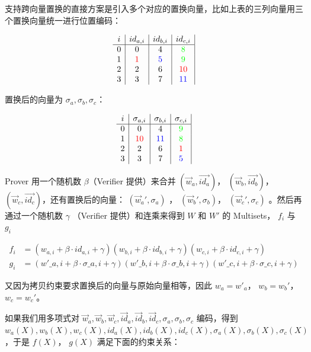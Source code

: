 支持跨向量置换的直接方案是引入多个对应的置换向量，比如上表的三列向量用三个置换向量统一进行位置编码：

\[
\begin{array}{c|c|c|c|}
i & id_{a,i} & id_{b,i} & id_{c,i}  \\
\hline
0 & 0 & 4 & {\color{green}8} \\
1 & {\color{red}1} & {\color{blue}5} & {\color{green}9} \\
2 & 2 & 6 & {\color{red}10} \\
3 & 3 & 7 & {\color{blue}11} \\
\end{array}
\]

置换后的向量为 \(\sigma_a, \sigma_b, \sigma_c\)：

\[
\begin{array}{c|c|c|c|}
i & \sigma_{a,i} & \sigma_{b,i} & \sigma_{c,i}  \\
\hline
0 & 0 & 4 & {\color{green}9} \\
1 & {\color{red}10} & {\color{blue}11} & {\color{green}8} \\
2 & 2 & 6 & {\color{red}1} \\
3 & 3 & 7 & {\color{blue}5} \\
\end{array}
\]

Prover 用一个随机数 \(\beta\)（Verifier 提供）来合并
\((\vec{w}_a, \vec{id_a})\)， \((\vec{w}_b, \vec{id_b})\)，
\((\vec{w}_c, \vec{id_c})\)，还有置换后的向量：
\((\vec{w}_a', \sigma_a)\) ， \((\vec{w}_b', \sigma_b)\)，
\((\vec{w}_c', \sigma_c)\) 。然后再通过一个随机数 \(\gamma\) （Verifier
提供）和连乘来得到 \(W\) 和 \(W'\) 的 Multisets， \({f_i}\) 与
\({g_i}\)

\[
\begin{split}
f_i &= (w_{a,i}+\beta\cdot id_{a,i}+\gamma)(w_{b,i}+\beta\cdot id_{b,i}+\gamma)(w_{c,i}+\beta\cdot id_{c,i}+\gamma) \\
g_i &= (w'\_{a,i}+\beta\cdot \sigma\_{a,i}+\gamma)(w'\_{b,i}+\beta\cdot \sigma\_{b,i}+\gamma)(w'\_{c,i}+\beta\cdot \sigma\_{c,i}+\gamma)
\end{split}
\]

又因为拷贝约束要求置换后的向量与原始向量相等，因此 \(w_a=w'_a\)，
\(w_b=w_b'\)， \(w_c=w_c'\)。

如果我们用多项式对
\(\vec{w}_a,\vec{w}_b,\vec{w}_c,\vec{id}_a,\vec{id}_b,\vec{id}_c,\sigma_a, \sigma_b, \sigma_c\)
编码，得到
\(w_a(X),w_b(X), w_c(X), id_a(X),id_b(X),id_c(X),\sigma_a(X),\sigma_b(X),\sigma_c(X)\)，于是
\(f(X)\)， \(g(X)\) 满足下面的约束关系：

